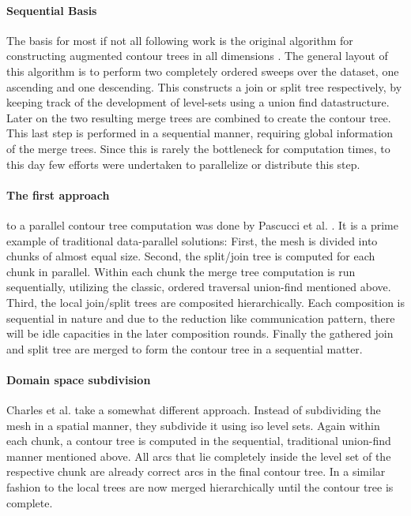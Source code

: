 \documentclass[%
	paper=A4,					%
	twoside=true,				%
	openright,					%
	parskip=full,				%
	chapterprefix=true,			%
	11pt,						%
	headings=normal,			%
	bibliography=totoc,			%
	listof=totoc,				%
	titlepage=on,				%
	captions=tableabove,		%
	draft=false,				%
]{scrreprt}%
\begin{document}
\paragraph{Sequential Basis} 
The basis for most if not all following work is the original algorithm for constructing augmented contour trees in all dimensions \cite{orig}. The general layout of this algorithm is to perform two completely ordered sweeps over the dataset, one ascending and one descending. This constructs a join or split tree respectively, by keeping track of the development of level-sets using a union find datastructure. Later on the two resulting merge trees are combined to create the contour tree. This last step is performed in a sequential manner, requiring global information of the merge trees. Since this is rarely the bottleneck for computation times, to this day few efforts were undertaken to parallelize or distribute this step.

\paragraph{The first approach} to a parallel contour tree computation was done by Pascucci et al. \cite{pascucci1}. It is a prime example of traditional data-parallel solutions: First, the mesh is divided into chunks of almost equal size. Second, the split/join tree is computed for each chunk in parallel. Within each chunk the merge tree computation is run sequentially, utilizing the classic, ordered traversal union-find mentioned above. Third, the local join/split trees are composited hierarchically. Each composition is sequential in nature and due to the reduction like communication pattern, there will be idle capacities in the later composition rounds. Finally the gathered join and split tree are merged to form the contour tree in a sequential matter.

\paragraph{Domain space subdivision}
Charles et al. \cite{Charles} take a somewhat different approach. Instead of subdividing the mesh in a spatial manner, they subdivide it using iso level sets. Again within each chunk, a contour tree is computed in the sequential, traditional union-find manner mentioned above. All arcs that lie completely inside the level set of the respective chunk are already correct arcs in the final contour tree. In a similar fashion to \cite{pascucci1} the local trees are now merged hierarchically until the contour tree is complete. 
\end{document}
